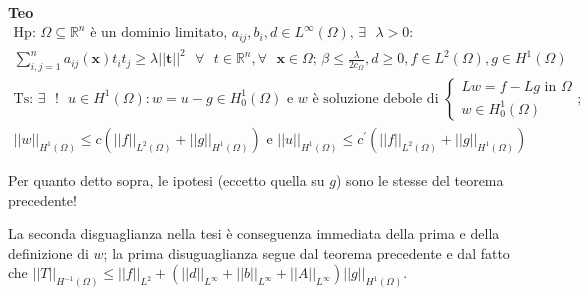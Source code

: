 \documentclass{article}
\begin{document}
\textbf{Teo}%
\begin{gather*}
\text{Hp: }\Omega \subseteq 
\mathbb{R}
^{n}\text{ \`{e} un dominio limitato, }a_{ij},b_{i},d\in L^{\infty }\left(
\Omega \right) \text{, }\exists \text{ }\lambda >0: \\
\sum_{i,j=1}^{n}a_{ij}\left( \mathbf{x}\right) t_{i}t_{j}\geq \lambda
\left\vert \left\vert \mathbf{t}\right\vert \right\vert ^{2}\text{ }\forall 
\text{ }t\in 
\mathbb{R}
^{n},\forall \text{ }\mathbf{x}\in \Omega \text{; }\beta \leq \frac{\lambda 
}{2c_{\Omega }},d\geq 0,f\in L^{2}\left( \Omega \right) ,g\in H^{1}\left(
\Omega \right) \\
\text{Ts: }\exists \text{ }!\text{ }u\in H^{1}\left( \Omega \right)
:w=u-g\in H_{0}^{1}\left( \Omega \right) \text{ e }w\text{ \`{e} soluzione
debole di }\left\{ 
\begin{array}{c}
Lw=f-Lg\text{ in }\Omega \\ 
w\in H_{0}^{1}\left( \Omega \right)%
\end{array}%
\right. \text{;} \\
\left\vert \left\vert w\right\vert \right\vert _{H^{1}\left( \Omega \right)
}\leq c\left( \left\vert \left\vert f\right\vert \right\vert _{L^{2}\left(
\Omega \right) }+\left\vert \left\vert g\right\vert \right\vert
_{H^{1}\left( \Omega \right) }\right) \text{ e }\left\vert \left\vert
u\right\vert \right\vert _{H^{1}\left( \Omega \right) }\leq c^{\prime
}\left( \left\vert \left\vert f\right\vert \right\vert _{L^{2}\left( \Omega
\right) }+\left\vert \left\vert g\right\vert \right\vert _{H^{1}\left(
\Omega \right) }\right)
\end{gather*}

Per quanto detto sopra, le ipotesi (eccetto quella su $g$) sono le stesse
del teorema precedente!

La seconda disguaglianza nella tesi \`{e} conseguenza immediata della prima
e della definizione di $w$; la prima disuguaglianza segue dal teorema
precedente e dal fatto che $\left\vert \left\vert T\right\vert \right\vert
_{H^{-1}\left( \Omega \right) }\leq \left\vert \left\vert f\right\vert
\right\vert _{L^{2}}+\left( \left\vert \left\vert d\right\vert \right\vert
_{L^{\infty }}+\left\vert \left\vert b\right\vert \right\vert _{L^{\infty
}}+\left\vert \left\vert A\right\vert \right\vert _{L^{\infty }}\right)
\left\vert \left\vert g\right\vert \right\vert _{H^{1}\left( \Omega \right)
} $.
\end{document}
